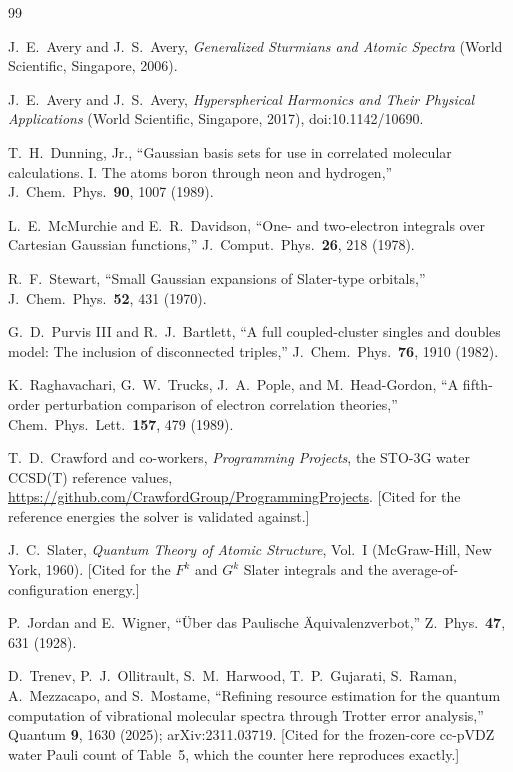 \documentclass[aps,pra,twocolumn,superscriptaddress,longbibliography]{revtex4-2}
\begin{document}
\begin{thebibliography}{99}

J.~E.~Avery and J.~S.~Avery, \textit{Generalized Sturmians and Atomic Spectra}
(World Scientific, Singapore, 2006).

J.~E.~Avery and J.~S.~Avery, \textit{Hyperspherical Harmonics and Their
Physical Applications} (World Scientific, Singapore, 2017),
doi:10.1142/10690.

T.~H.~Dunning, Jr., ``Gaussian basis sets for use in correlated molecular
calculations. I. The atoms boron through neon and hydrogen,''
J.\ Chem.\ Phys.\ \textbf{90}, 1007 (1989).

L.~E.~McMurchie and E.~R.~Davidson, ``One- and two-electron integrals over
Cartesian Gaussian functions,'' J.\ Comput.\ Phys.\ \textbf{26}, 218 (1978).

R.~F.~Stewart, ``Small Gaussian expansions of Slater-type orbitals,''
J.\ Chem.\ Phys.\ \textbf{52}, 431 (1970).

G.~D.~Purvis III and R.~J.~Bartlett, ``A full coupled-cluster singles and
doubles model: The inclusion of disconnected triples,''
J.\ Chem.\ Phys.\ \textbf{76}, 1910 (1982).

K.~Raghavachari, G.~W.~Trucks, J.~A.~Pople, and M.~Head-Gordon, ``A fifth-order
perturbation comparison of electron correlation theories,''
Chem.\ Phys.\ Lett.\ \textbf{157}, 479 (1989).

T.~D.~Crawford and co-workers, \textit{Programming Projects}, the
STO-3G water CCSD(T) reference values, \url{https://github.com/CrawfordGroup/ProgrammingProjects}.
[Cited for the reference energies the solver is validated against.]

J.~C.~Slater, \textit{Quantum Theory of Atomic Structure}, Vol.~I
(McGraw-Hill, New York, 1960).
[Cited for the $F^{k}$ and $G^{k}$ Slater integrals and the
average-of-configuration energy.]

P.~Jordan and E.~Wigner, ``\"Uber das Paulische \"Aquivalenzverbot,''
Z.\ Phys.\ \textbf{47}, 631 (1928).

D.~Trenev, P.~J.~Ollitrault, S.~M.~Harwood, T.~P.~Gujarati,
S.~Raman, A.~Mezzacapo, and S.~Mostame,
``Refining resource estimation for the quantum computation of
vibrational molecular spectra through Trotter error analysis,''
Quantum \textbf{9}, 1630 (2025); arXiv:2311.03719.
[Cited for the frozen-core cc-pVDZ water Pauli count of Table~5,
which the counter here reproduces exactly.]


\end{thebibliography}
\end{document}
